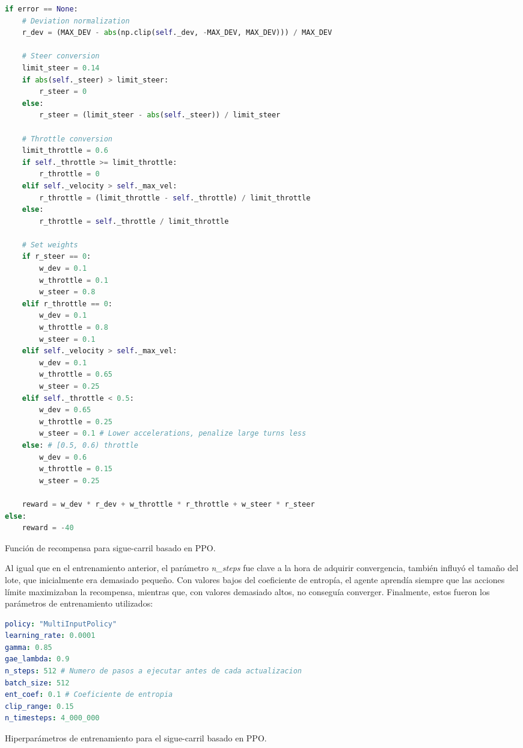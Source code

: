 \begin{code}[h]
\begin{lstlisting}[language=Python]
if error == None:
    # Deviation normalization
    r_dev = (MAX_DEV - abs(np.clip(self._dev, -MAX_DEV, MAX_DEV))) / MAX_DEV
    
    # Steer conversion
    limit_steer = 0.14
    if abs(self._steer) > limit_steer:
        r_steer = 0
    else:
        r_steer = (limit_steer - abs(self._steer)) / limit_steer

    # Throttle conversion
    limit_throttle = 0.6
    if self._throttle >= limit_throttle:
        r_throttle = 0
    elif self._velocity > self._max_vel:
        r_throttle = (limit_throttle - self._throttle) / limit_throttle
    else:
        r_throttle = self._throttle / limit_throttle

    # Set weights
    if r_steer == 0:
        w_dev = 0.1
        w_throttle = 0.1
        w_steer = 0.8
    elif r_throttle == 0:
        w_dev = 0.1
        w_throttle = 0.8
        w_steer = 0.1
    elif self._velocity > self._max_vel:
        w_dev = 0.1
        w_throttle = 0.65
        w_steer = 0.25
    elif self._throttle < 0.5:
        w_dev = 0.65
        w_throttle = 0.25
        w_steer = 0.1 # Lower accelerations, penalize large turns less
    else: # [0.5, 0.6) throttle
        w_dev = 0.6
        w_throttle = 0.15
        w_steer = 0.25

    reward = w_dev * r_dev + w_throttle * r_throttle + w_steer * r_steer
else:
    reward = -40

\end{lstlisting}
\caption[Función de recompensa para sigue-carril basado en \ac{PPO}]{Función de recompensa para sigue-carril basado en \ac{PPO}.}
\label{cod:rew_ppo}
\end{code}

Al igual que en el entrenamiento anterior, el parámetro \textit{n\_steps} fue clave a la hora de adquirir convergencia, también influyó el tamaño del lote, que inicialmente era demasiado pequeño. Con valores bajos del coeficiente de entropía, el agente aprendía siempre que las acciones límite maximizaban la recompensa, mientras que, con valores demasiado altos, no conseguía converger. Finalmente, estos fueron los parámetros de entrenamiento utilizados:
\begin{code}[h]
\begin{lstlisting}[language=yaml]
policy: "MultiInputPolicy"
learning_rate: 0.0001
gamma: 0.85
gae_lambda: 0.9
n_steps: 512 # Numero de pasos a ejecutar antes de cada actualizacion
batch_size: 512 
ent_coef: 0.1 # Coeficiente de entropia
clip_range: 0.15 
n_timesteps: 4_000_000

\end{lstlisting}
\caption[Hiperparámetros de entrenamiento para el sigue-carril basado en \ac{PPO}]{Hiperparámetros de entrenamiento para el sigue-carril basado en \ac{PPO}.}
\label{cod:hiper_params_ppo}
\end{code}

